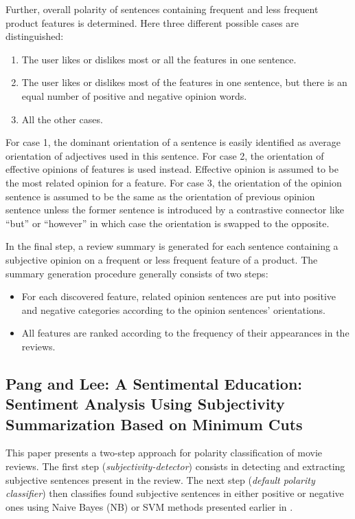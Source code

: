 \documentclass[a4paper,11pt]{article}
\begin{document}
Further, overall polarity of sentences containing frequent and less frequent
product features is determined.  Here three different possible cases are
distinguished:
\begin{enumerate}
  \item The user likes or dislikes most or all the features in one sentence.
  \item The user likes or dislikes most of the features in one sentence, but
    there is an equal number of positive and negative opinion words.
  \item All the other cases.
\end{enumerate}
For case 1, the dominant orientation of a sentence is easily identified as
average orientation of adjectives used in this sentence.  For case 2, the
orientation of effective opinions of features is used instead.  Effective
opinion is assumed to be the most related opinion for a feature.  For case 3,
the orientation of the opinion sentence is assumed to be the same as the
orientation of previous opinion sentence unless the former sentence is
introduced by a contrastive connector like ``but'' or ``however'' in which
case the orientation is swapped to the opposite.

In the final step, a review summary is generated for each sentence containing
a subjective opinion on a frequent or less frequent feature of a product.  The
summary generation procedure generally consists of two steps:
\begin{itemize}
  \item For each discovered feature, related opinion sentences are put into
    positive and negative categories according to the opinion sentences'
    orientations.

  \item All features are ranked according to the frequency of their
    appearances in the reviews.
\end{itemize}

\subsection{Pang and Lee: A Sentimental Education: Sentiment Analysis Using Subjectivity
               Summarization Based on Minimum Cuts\cite{Pang-Lee-04}}

This paper presents a two-step approach for polarity classification of
movie reviews.  The first step (\textit{subjectivity-detector})
consists in detecting and extracting subjective sentences present in
the review.  The next step (\textit{default polarity classifier}) then
classifies found subjective sentences in either positive or negative
ones using Naive Bayes (NB) or SVM methods presented earlier in
\cite{Pang-Lee-02}.
\end{document}
